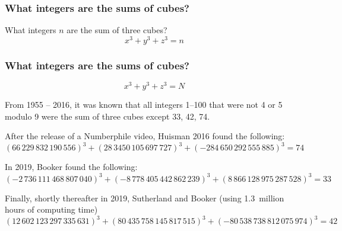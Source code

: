 \begin{frame}[plain,t] \frametitle{What integers are the sums of cubes?} \footnotesize
What integers $n$ are the sum of three cubes?
	\[
	x^3 + y^3 + z^3= n
	\]
\end{frame}



\begin{frame} \frametitle{What integers are the sums of cubes?} \footnotesize
	\[
	x^3 + y^3 + z^3= N
	\] \pspace

{\color{SwarthGarnet} \textbullet} From 1955 -- 2016, it was known that all integers 1--100 that were not 4 or 5 modulo 9 were the sum of three cubes except 33, 42, 74. \pspace

{\color{SwarthGarnet} \textbullet} After the release of a Numberphile video, Huisman 2016 found the following:
	{\footnotesize
	\[
	(66\,229\,832\,190\,556)^3 + (28\,3450\,105\,697\,727)^3 + (-284\,650\,292\,555\,885)^3= 74
	\]
	} \pspace
	
{\color{SwarthGarnet} \textbullet} In 2019, Booker found the following:
	{\footnotesize
	\[
	(-2\,736\,111\,468\,807\,040)^3 + (-8\,778\,405\,442\,862\,239)^3 + (8\,866\,128\,975\,287\,528)^3= 33
	\]
	} \pspace
	
{\color{SwarthGarnet} \textbullet} Finally, shortly thereafter in 2019, Sutherland and Booker (using 1.3~million hours of computing time)
	{\footnotesize
	\[
	(12\,602\,123\,297\,335\,631)^3 + (80\,435\,758\,145\,817\,515)^3 + (-80\,538\,738\,812\,075\,974)^3= 42
	\]
	}
\end{frame}



